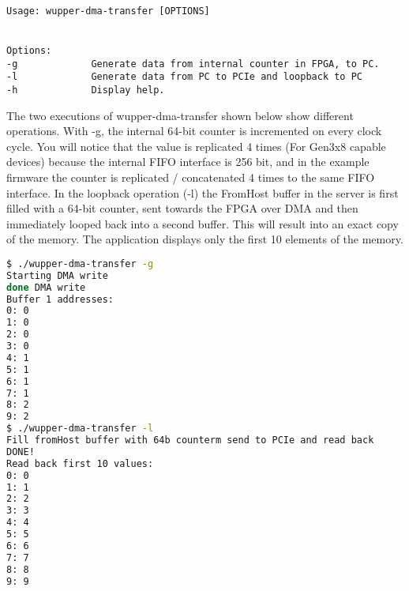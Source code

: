 \begin{lstlisting}[frame=single, label={lst:dmatoollist}, caption=Output of Wupper-dma-transfer -h]
Usage: wupper-dma-transfer [OPTIONS]


Options:
-g             Generate data from internal counter in FPGA, to PC.
-l             Generate data from PC to PCIe and loopback to PC
-h             Display help.

\end{lstlisting}

The two executions of wupper-dma-transfer shown below show different operations. With -g, the internal 64-bit counter is incremented on every clock cycle. You will notice that the value is replicated 4 times (For Gen3x8 capable devices) because the internal FIFO interface is 256 bit, and in the example firmware the counter is replicated / concatenated 4 times to the same FIFO interface. In the loopback operation (-l) the FromHost buffer in the server is first filled with a 64-bit counter, sent towards the FPGA over DMA and then immediately looped back into a second buffer. This will result into an exact copy of the memory. The application displays only the first 10 elements of the memory.
\begin{lstlisting}[language=BASH, frame=single, label={lst:dmatoolreset},  caption=Reset Wupper before a DMA Write action]
$ ./wupper-dma-transfer -g
Starting DMA write
done DMA write 
Buffer 1 addresses:
0: 0 
1: 0 
2: 0 
3: 0 
4: 1 
5: 1 
6: 1 
7: 1 
8: 2 
9: 2 
$ ./wupper-dma-transfer -l
Fill fromHost buffer with 64b counterm send to PCIe and read back
DONE!
Read back first 10 values:
0: 0 
1: 1 
2: 2 
3: 3 
4: 4 
5: 5 
6: 6 
7: 7 
8: 8 
9: 9 

\end{lstlisting}
